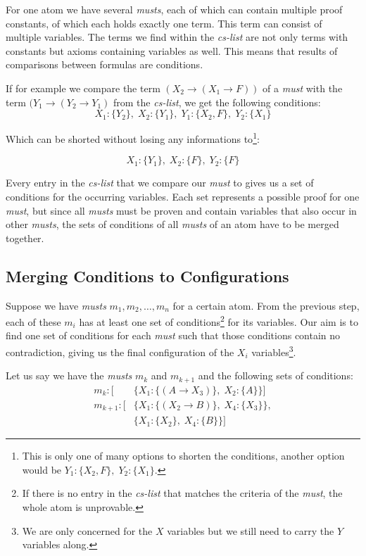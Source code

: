 For one atom we have several \emph{musts}, each of which can contain multiple proof constants, of which each holds exactly one term. This term can consist of multiple variables. The terms we find within the \emph{cs-list} are not only terms with constants but axioms containing variables as well. This means that results of comparisons between formulas are conditions. 

If for example we compare the term $(X_2 \rightarrow (X_1 \rightarrow F))$ of a \emph{must} with the term $(Y_1 \rightarrow (Y_2 \rightarrow Y_1)$ from the \emph{cs-list}, we get the following conditions:
\begin{equation*}
	X_1 : \{Y_2\},\; X_2 : \{Y_1\},\; Y_1 : \{X_2, F\},\; Y_2 : \{X_1\} 
\end{equation*}

Which can be shorted without losing any informations to\footnote{This is only one of many options to shorten the conditions, another option would be $Y_1: \{X_2, F\},\; Y_2:\{X_1\}$.}:

\begin{equation*}
	X_1 : \{Y_1\},\; X_2 : \{F\},\; Y_2 : \{F\}
\end{equation*}

Every entry in the \emph{cs-list} that we compare our \emph{must} to gives us a set of conditions for the occurring variables. Each set represents a possible proof for one \emph{must}, but since all \emph{musts} must be proven and contain variables that also occur in other \emph{musts}, the sets of conditions of all \emph{musts} of an atom have to be merged together.

\subsection{Merging Conditions to Configurations}
Suppose we have \emph{musts} $m_1, m_2, \dots, m_n$ for a certain atom. From the previous step, each of these $m_i$ has at least one set of conditions\footnote{If there is no entry in the \emph{cs-list} that matches the criteria of the \emph{must}, the whole atom is unprovable.} for its variables. Our aim is to find one set of conditions for each \emph{must} such that those conditions contain no contradiction, giving us the final configuration of the $X_i$ variables\footnote{We are only concerned for the $X$ variables but we still need to carry the $Y$ variables along.}.

Let us say we have the \emph{musts} $m_k$ and $m_{k+1}$ and the following sets of conditions: 
\begin{align*}
	m_k: [	& \{X_1: \{(A \rightarrow X_3)\},\; X_2: \{A\}\}]\\
	m_{k+1}: [	& \{X_1: \{(X_2 \rightarrow B)\},\; X_4: \{X_3\}\},\\
			& \{X_1: \{X_2\},\; X_4: \{B\}\}]
\end{align*}

